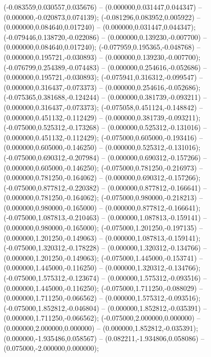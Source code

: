  (-0.083559,0.030557,0.035676) -- (0.000000,0.031447,0.044347) -- (0.000000,-0.020873,0.074139);
 (-0.081296,0.083952,0.005922) -- (0.000000,0.084640,0.017240) -- (0.000000,0.031447,0.044347);
 (-0.079446,0.138720,-0.022086) -- (0.000000,0.139230,-0.007700) -- (0.000000,0.084640,0.017240);
 (-0.077959,0.195365,-0.048768) -- (0.000000,0.195721,-0.030893) -- (0.000000,0.139230,-0.007700);
 (-0.076799,0.254389,-0.074483) -- (0.000000,0.254616,-0.052686) -- (0.000000,0.195721,-0.030893);
 (-0.075941,0.316312,-0.099547) -- (0.000000,0.316437,-0.073373) -- (0.000000,0.254616,-0.052686);
 (-0.075365,0.381688,-0.124244) -- (0.000000,0.381739,-0.093211) -- (0.000000,0.316437,-0.073373);
 (-0.075058,0.451124,-0.148842) -- (0.000000,0.451132,-0.112429) -- (0.000000,0.381739,-0.093211);
 (-0.075000,0.525312,-0.173268) -- (0.000000,0.525312,-0.131016) -- (0.000000,0.451132,-0.112429);
 (-0.075000,0.605000,-0.193416) -- (0.000000,0.605000,-0.146250) -- (0.000000,0.525312,-0.131016);
 (-0.075000,0.690312,-0.207984) -- (0.000000,0.690312,-0.157266) -- (0.000000,0.605000,-0.146250);
 (-0.075000,0.781250,-0.216973) -- (0.000000,0.781250,-0.164062) -- (0.000000,0.690312,-0.157266);
 (-0.075000,0.877812,-0.220382) -- (0.000000,0.877812,-0.166641) -- (0.000000,0.781250,-0.164062);
 (-0.075000,0.980000,-0.218213) -- (0.000000,0.980000,-0.165000) -- (0.000000,0.877812,-0.166641);
 (-0.075000,1.087813,-0.210463) -- (0.000000,1.087813,-0.159141) -- (0.000000,0.980000,-0.165000);
 (-0.075000,1.201250,-0.197135) -- (0.000000,1.201250,-0.149063) -- (0.000000,1.087813,-0.159141);
 (-0.075000,1.320312,-0.178228) -- (0.000000,1.320312,-0.134766) -- (0.000000,1.201250,-0.149063);
 (-0.075000,1.445000,-0.153741) -- (0.000000,1.445000,-0.116250) -- (0.000000,1.320312,-0.134766);
 (-0.075000,1.575312,-0.123674) -- (0.000000,1.575312,-0.093516) -- (0.000000,1.445000,-0.116250);
 (-0.075000,1.711250,-0.088029) -- (0.000000,1.711250,-0.066562) -- (0.000000,1.575312,-0.093516);
 (-0.075000,1.852812,-0.046804) -- (0.000000,1.852812,-0.035391) -- (0.000000,1.711250,-0.066562);
 (-0.075000,2.000000,0.000000) -- (0.000000,2.000000,0.000000) -- (0.000000,1.852812,-0.035391);
 (0.000000,-1.935486,0.058567) -- (0.082211,-1.934806,0.058086) -- (0.075000,-2.000000,0.000000);
